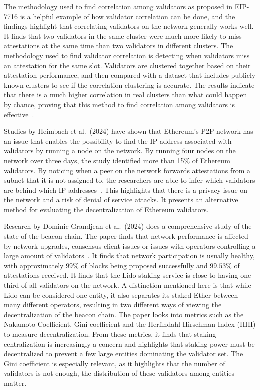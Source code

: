 \documentclass[runningheads]{llncs}
\begin{document}
The methodology used to find correlation among validators as proposed in EIP-7716 is a helpful example of how validator correlation can be done, and the findings highlight that correlating validators on the network generally works well. 
It finds that two validators in the same cluster were much more likely to miss attestations at the same time than two validators in different clusters. The methodology used to find validator correlation is detecting when validators miss an attestation for the same slot. 
Validators are clustered together based on their attestation performance, and then compared with a dataset that includes publicly known clusters to see if the correlation clustering is accurate. 
The results indicate that there is a much higher correlation in real clusters than what could happen by chance, proving that this method to find correlation among validators is effective~\cite{eip7716_2024_vitalikethresear}. 

Studies by Heimbach et al.~(2024) have shown that Ethereum's P2P network has an issue that enables the possibility to find the IP address associated with validators by running a node on the network. 
By running four nodes on the network over three days, the study identified more than 15\% of Ethereum validators. 
By noticing when a peer on the network forwards attestations from a subnet that it is not assigned to, the researchers are able to infer which validators are behind which IP addresses~\cite{heimbach2024deanonymizing}. 
This highlights that there is a privacy issue on the network and a risk of denial of service attacks. 
It presents an alternative method for evaluating the decentralization of Ethereum validators. 

Research by Dominic Grandjean et al.~(2024) does a comprehensive study of the state of the beacon chain. The paper finds that network performance is affected by network upgrades, consensus client issues or issues with operators controlling a large amount of validators~\cite{grandjean2023ethereum}. It finds that network participation is usually healthy, with approximately $99\%$ of blocks being proposed successfully and $99.53\%$ of attestations received.
It finds that the Lido staking service is close to having one third of all validators on the network. A distinction mentioned here is that while Lido can be considered one entity, it also separates its staked Ether between many different operators, resulting in two different ways of viewing the decentralization of the beacon chain. The paper looks into metrics such as the Nakamoto Coefficient, Gini coefficient and the Herfindahl-Hirschman Index (HHI) to measure decentralization. From these metrics, it finds that staking centralization is increasingly a concern and highlights that staking power must be decentralized to prevent a few large entities dominating the validator set. The Gini coefficient is especially relevant, as it highlights that the number of validators is not enough, the distribution of these validators among entities matter. 
\end{document}
